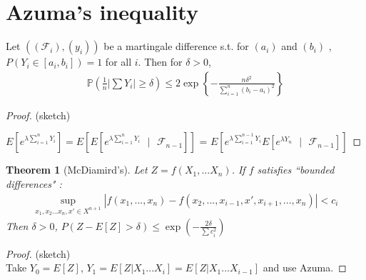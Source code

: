 \documentclass[10pt]{article}
\newcounter{lecnum}
\newtheorem{theorem}{Theorem}[lecnum]
\newcommand{\given}{\mbox{ }\vert\mbox{ }}
\renewcommand{\P}{\mathbb{P}}
\begin{document}
\section{Azuma's inequality}
Let $((\mathscr{F}_{i}), (y_{i}))$ be a martingale difference s.t. for $(a_{i})$ and $(b_{i})$ , $P(Y_{i} \in [a_{i}, b_{i}]) = 1 $ for all $i$. Then for $\delta > 0$, 
\begin{align*}
\P\left(\frac{1}{n}\left|\sum Y_{i}\right| \ge \delta\right) \le 2\exp\left\{-\frac{n\delta^{2}}{\sum_{i=1}^{n}(b_{i}-a_{i})^{2}  }\right\}
\end{align*}
\begin{proof} (sketch) \par
$E\left[e^{\lambda \sum_{i=1}^{n}Y_{i}}\right] = E\left[E\left[e^{\lambda\sum_{i=1}^{n}Y_{i}}\given\mathscr{F}_{n-1}\right]\right] $
= $ E\left[e^{\lambda \sum_{i=1}^{n-1} Y_{i}} E\left[e^{ \lambda Y_{n} } \given \mathscr{F}_{n-1}\right]\right] $ 
\end{proof}


\begin{theorem}[McDiamird's]
Let $Z = f(X_{1},...X_{n})$. If $f$ satisfies ``bounded differences" : \\
\begin{align*}
\sup\limits_{x_{1},x_{2}...x_{n},x'\in X^{n+1}}|f(x_{1},...,x_{n}) - f(x_{2},..., x_{i-1},x', x_{i+1},...,x_{n})| < c_{i}
\end{align*}
Then $\delta > 0$, $P(Z - E[Z] > \delta) \le \exp\left(-\frac{2\delta}{\sum c_{i}^{2}}\right)$
\end{theorem}
\begin{proof} (sketch) \\
Take
$Y_{0} = E[Z]$, $Y_{1} = E[Z|X_{1}...X_{i}] = E[Z|X_{1}...X_{i-1}]$ and use Azuma.
\end{proof}


\end{document}
